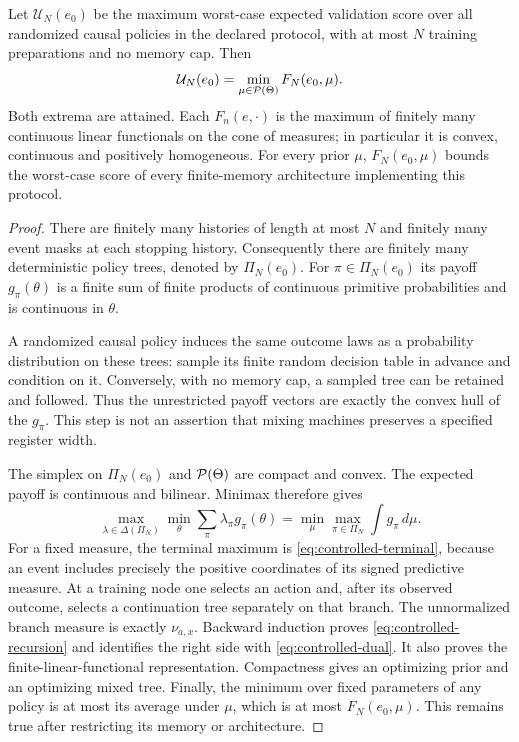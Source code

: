 \begin{theorem}
\label{thm:controlled}
Let $\mathcal U_N(e_0)$ be the maximum worst-case expected validation
score over all randomized causal policies in the declared protocol,
with at most $N$ training preparations and no memory cap. Then
\begin{equation}\label{eq:controlled-dual}
       \mathcal U_N(e_0)=\min_{\mu\in\mathcal P(\Theta)}F_N(e_0,\mu).
\end{equation}
Both extrema are attained. Each $F_n(e,\cdot)$ is the maximum of
finitely many continuous linear functionals on the cone of measures;
in particular it is convex, continuous and positively homogeneous.
For every prior $\mu$, $F_N(e_0,\mu)$ bounds the worst-case score of
every finite-memory architecture implementing this protocol.
\end{theorem}
\begin{proof}
There are finitely many histories of length at most $N$ and finitely
many event masks at each stopping history. Consequently there are
finitely many deterministic policy trees, denoted by $\Pi_N(e_0)$.
For $\pi\in\Pi_N(e_0)$ its payoff $g_\pi(\theta)$ is a finite sum
of finite products of continuous primitive probabilities and is
continuous in $\theta$.

A randomized causal policy induces the same outcome laws as a probability
distribution on these trees: sample its finite random decision table in
advance and condition on it. Conversely, with no memory cap, a sampled
tree can be retained and followed. Thus the unrestricted payoff vectors
are exactly the convex hull of the $g_\pi$. This step is not an assertion
that mixing machines preserves a specified register width.

The simplex on $\Pi_N(e_0)$ and $\mathcal P(\Theta)$ are compact and convex.
The expected payoff is continuous and bilinear. Minimax therefore gives
\[
 \max_{\lambda\in\Delta(\Pi_N)}\min_\theta
       \sum_\pi\lambda_\pi g_\pi(\theta)
 =\min_\mu\max_{\pi\in\Pi_N}\int g_\pi\,d\mu.
\]
For a fixed measure, the terminal maximum is
\eqref{eq:controlled-terminal}, because an event includes precisely the
positive coordinates of its signed predictive measure. At a training
node one selects an action and, after its observed outcome, selects a
continuation tree separately on that branch. The unnormalized branch
measure is exactly $\nu_{a,x}$. Backward induction proves
\eqref{eq:controlled-recursion} and identifies the right side with
\eqref{eq:controlled-dual}. It also proves the finite-linear-functional
representation. Compactness gives an optimizing prior and an optimizing
mixed tree. Finally, the minimum over fixed parameters of any policy is
at most its average under $\mu$, which is at most $F_N(e_0,\mu)$.
This remains true after restricting its memory or architecture.
\end{proof}

